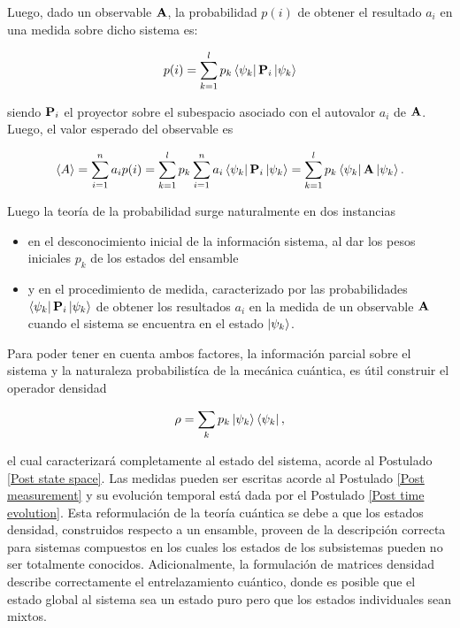 \documentclass{report} %
\numberwithin{equation}{section}
\begin{document}
Luego, dado un observable ${\bf A}$, la probabilidad $p(i)$ de obtener el resultado $a_i$ en una medida sobre dicho sistema es:

$$
p(i) = \sum_{k=1}^{l} p_k \bra{\psi_k}\mathbf{P}_i \ket{\psi_k}
$$

siendo ${\bf P}_i$ el proyector sobre el subespacio asociado con el autovalor $a_i$ de ${\bf A}$. Luego, el valor esperado del observable es

$$
\langle A \rangle = \sum_{i = 1}^{n} a_i p(i) = \sum_{k=1}^{l} p_k \sum_{i=1}^{n} a_i \bra{\psi_k}\mathbf{P}_i\ket{\psi_k} = \sum_{k=1}^{l} p_k \bra{\psi_k}\mathbf{A}\ket{\psi_k}.
$$

Luego la teoría de la probabilidad surge naturalmente en dos instancias

\begin{itemize}
    \item en el desconocimiento inicial de la información sistema, al dar los pesos iniciales $p_k$ de los estados del ensamble
    \item y en el procedimiento de medida, caracterizado por las probabilidades $ \bra{\psi_k}\mathbf{P}_i \ket{\psi_k}$ de obtener los resultados $a_i$ en la medida de un observable ${\bf A}$ cuando el sistema se encuentra en el estado $\ket{\psi_k}$. 
\end{itemize}

\break

Para poder tener en cuenta ambos factores, la información parcial sobre el sistema y la naturaleza probabilistíca de la mecánica cuántica, es útil construir el operador densidad 

$$
\rho = \sum_{k} p_k \ket{\psi_k}\bra{\psi_k},
$$

el cual caracterizará completamente al estado del sistema, acorde al Postulado \ref{Post state space}. Las medidas pueden ser escritas acorde al Postulado \ref{Post measurement} y su evolución temporal está dada por el Postulado \ref{Post time evolution}. Esta reformulación de la teoría cuántica se debe a que los estados densidad, construidos respecto a un ensamble, proveen de la descripción correcta para sistemas compuestos en los cuales los estados de los subsistemas pueden no ser totalmente conocidos. Adicionalmente, la formulación de matrices densidad describe correctamente el entrelazamiento cuántico, donde es posible que el estado global al sistema sea un estado puro pero que los estados individuales sean mixtos. 

\end{document}
